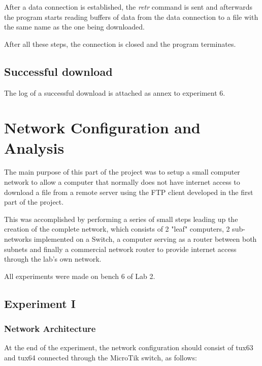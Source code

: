 \documentclass[11pt,a4paper,twocolumn]{article}
\begin{document}
After a data connection is established, the \textit{retr} command is sent and afterwards the program starts reading buffers of data from the data connection to a file with the same name as the one being downloaded.

After all these steps, the connection is closed and the program terminates.

\subsection{Successful download}

The log of a successful download is attached as annex to experiment 6.

\section{Network Configuration and Analysis}

The main purpose of this part of the project was to setup a small computer network to allow a computer that normally does not have internet access to download a file from a remote server using the FTP client developed in the first part of the project.

This was accomplished by performing a series of small steps leading up the creation of the complete network, which consists of 2 "leaf" computers, 2 sub-networks implemented on a Switch, a  computer serving as a router between both subnets and finally a commercial network router to provide internet access through the lab's own network.

All experiments were made on bench 6 of Lab 2.

\subsection{Experiment I}

\subsubsection{Network Architecture}

At the end of the experiment, the network configuration should consist of tux63 and tux64 connected through the MicroTik switch, as follows:
\end{document}
